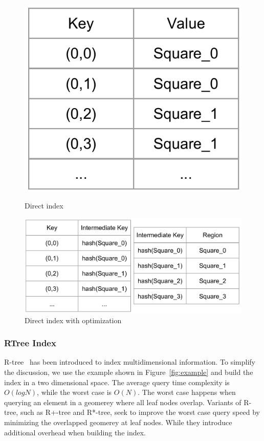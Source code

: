 \documentclass{sig-alternate}
\begin{document}
\begin{figure}
\centering
\begin{minipage}{.3\linewidth}
  \includegraphics[width=\linewidth]{pictures/direct}
  \caption{Direct index}
  \label{fig:direct}
\end{minipage}
\hspace{.05\linewidth}
\begin{minipage}{.6\linewidth}
  \includegraphics[width=\linewidth]{pictures/direct-optimized}
  \caption{Direct index with optimization}
  \label{fig:direct-optimized}
\end{minipage}
\end{figure}


\subsubsection{RTree Index}
R-tree~\cite{guttman1984} has been introduced to index multidimensional information.
To simplify the discussion, we use the example shown in Figure~\ref{fig:example} and build the index in a two dimensional space.
The average query time complexity is $O(logN)$, while the worst case is $O(N)$. 
The worst case happens when querying an element in a geomerey where all leaf nodes overlap.
Variants of R-tree, such as R+-tree and R*-tree, seek to improve the worst case query speed by minimizing the overlapped geomerey at leaf nodes.
While they introduce additional overhead when building the index.
\end{document}
